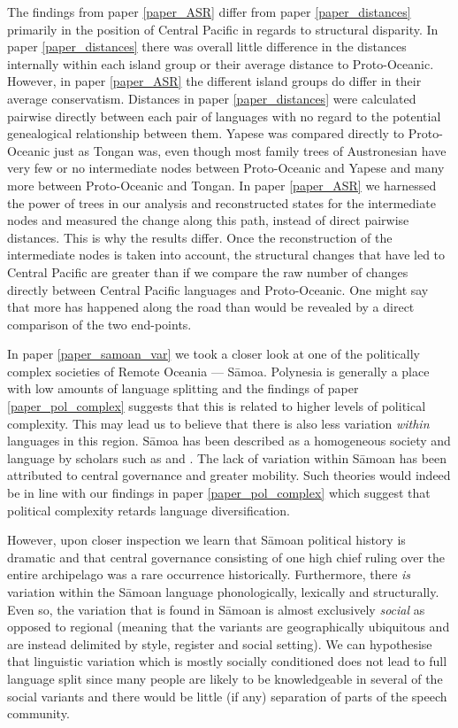 \documentclass[draft,10pt]{article} %
\begin{document}
The findings from paper \ref{paper_ASR} differ from paper \ref{paper_distances} primarily in the position of Central Pacific in regards to structural disparity. In paper \ref{paper_distances} there was overall little difference in the distances internally within each island group or their average distance to Proto-Oceanic. However, in paper \ref{paper_ASR} the different island groups do differ in their average conservatism. Distances in paper \ref{paper_distances} were calculated pairwise directly between each pair of languages with no regard to the potential genealogical relationship between them. Yapese was compared directly to Proto-Oceanic just as Tongan was, even though most family trees of Austronesian have very few or no intermediate nodes between Proto-Oceanic and Yapese and many more between Proto-Oceanic and Tongan. In paper \ref{paper_ASR} we harnessed the power of trees in our analysis and reconstructed states for the intermediate nodes and measured the change along this path, instead of direct pairwise distances. This is why the results differ. Once the reconstruction of the intermediate nodes is taken into account, the structural changes that have led to Central Pacific are greater than if we compare the raw number of changes directly between Central Pacific languages and Proto-Oceanic. One might say that more has happened along the road than would be revealed by a direct comparison of the two end-points.

In paper \ref{paper_samoan_var} we took a closer look at one of the politically complex societies of Remote Oceania --- S\={a}moa. Polynesia is generally a place with low amounts of language splitting and the findings of paper \ref{paper_pol_complex} suggests that this is related to higher levels of political complexity. This may lead us to believe that there is also less variation \emph{within} languages in this region. S\={a}moa has been described as a homogeneous society and language by scholars such as \citet{mead1937samoans} and \citet{turner1884}. The lack of variation within S\={a}moan has been attributed to central governance and greater mobility. Such theories would indeed be in line with our findings in paper \ref{paper_pol_complex} which suggest that political complexity retards language diversification.

However, upon closer inspection we learn that S\={a}moan political history is dramatic and that central governance consisting of one high chief ruling over the entire archipelago was a rare occurrence historically. Furthermore, there \emph{is} variation within the S\={a}moan language phonologically, lexically and structurally. Even so, the variation that is found in S\={a}moan is almost exclusively \emph{social} as opposed to regional (meaning that the variants are  geographically ubiquitous and are instead delimited by style, register and social setting). We can hypothesise that linguistic variation which is mostly socially conditioned does not lead to full language split since many people are likely to be knowledgeable in several of the social variants and there would be little (if any) separation of parts of the speech community. 
\end{document}
